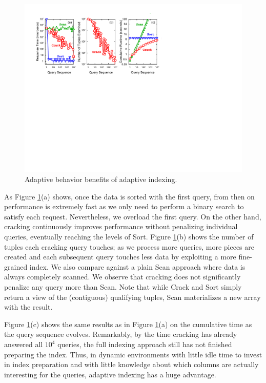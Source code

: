 \documentclass{sig-alternate}
\begin{document}
\begin{figure}[h]
\vspace{-1mm}
\includegraphics[width=1\columnwidth]{graphs/figure2.pdf}%
\vspace{-2mm}
\caption{Adaptive behavior benefits of adaptive indexing.}
\vspace{-1mm}
\label{F:BasicPerQuery}
\end{figure}

As Figure \ref{F:BasicPerQuery}(a) shows, once the data is sorted with the first query, from then on performance is extremely fast as we only need to perform a binary search to satisfy each request. Nevertheless, we overload the first query. On the other hand, cracking continuously improves performance without penalizing individual queries, eventually reaching the levels of {\sf Sort}. Figure \ref{F:BasicPerQuery}(b) shows the number of tuples each cracking query touches; as we process more queries, more pieces are created and each subsequent query touches less data by exploiting a more fine-grained index. We also compare against a plain {\sf Scan} approach where data is always completely scanned. We observe that cracking does not significantly penalize any query more than {\sf Scan}. Note that while {\sf Crack} and {\sf Sort} simply return a view of the (contiguous) qualifying tuples, {\sf Scan} materializes a new array with the result.

Figure \ref{F:BasicPerQuery}(c) shows the same results as in Figure \ref{F:BasicPerQuery}(a) on the cumulative time as the query sequence evolves. Remarkably, by the time cracking has already answered all $10^4$ queries, the full indexing approach still has not finished preparing the index. Thus, in dynamic environments with little idle time to invest in index preparation and with little knowledge about which columns are actually interesting for the queries, adaptive indexing has a huge advantage.
\end{document}
